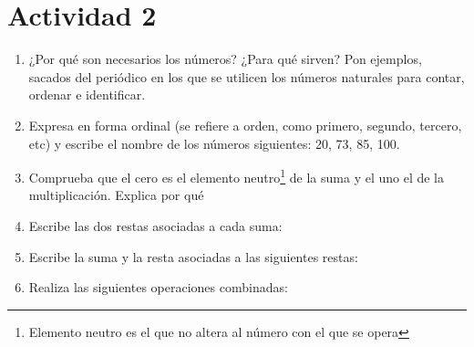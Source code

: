 \documentclass[10pt,twoside]{article}
\begin{document}
\section*{Actividad 2}
\begin{enumerate}
\item ¿Por qué son necesarios los números? ¿Para qué sirven? Pon ejemplos, sacados del periódico en los que se utilicen los números naturales para contar, ordenar e identificar.
\item Expresa en forma ordinal (se refiere a orden, como primero, segundo, tercero, etc) y escribe el nombre de los números siguientes: 20, 73, 85, 100.
\item Comprueba que el cero es el elemento neutro\footnote{Elemento neutro es el que no altera al número con el que se opera} de la suma y el uno el de la multiplicación. Explica por qué
\item Escribe las dos restas asociadas a cada suma:
\begin{enumerate}
\end{enumerate}
\item Escribe la suma y la resta asociadas a las siguientes restas:
\begin{enumerate}
\end{enumerate}
\item Realiza las siguientes operaciones combinadas:
\begin{enumerate}
\end{enumerate}
\end{enumerate}
\end{document}
